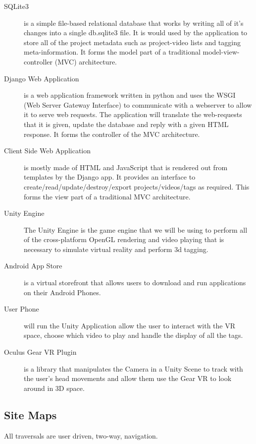 \documentclass[12pt]{report}
\begin{document}
\begin{description}
    \item [SQLite3] is a simple file-based relational database that works by
        writing all of it's changes into a single db.sqlite3 file. It is would
        used by the application to store all of the project metadata such as
        project-video lists and tagging meta-information. It forms the model
        part of a traditional model-view-controller (MVC) architecture.

    \item [Django Web Application] is a web application framework written in
        python and uses the WSGI (Web Server Gateway Interface) to communicate
        with a webserver to allow it to serve web requests. The application
        will translate the web-requests that it is given, update the database
        and reply with a given HTML response. It forms the controller of the
        MVC architecture.

    \item [Client Side Web Application] is mostly made of HTML and JavaScript
        that is rendered out from templates by the Django app. It provides an
        interface to create/read/update/destroy/export projects/videos/tags as
        required. This forms the view part of a traditional MVC architecture.

    \item [Unity Engine] The Unity Engine is the game engine that we will be
        using to perform all of the cross-platform OpenGL rendering and video
        playing that is necessary to simulate virtual reality and perform 3d
        tagging.

    \item [Android App Store] is a virtual storefront that allows users to
        download and run applications on their Android Phones. 

    \item [User Phone] will run the Unity Application allow the
        user to interact with the VR space, choose which video to play and
        handle the display of all the tags.

    \item [Oculus Gear VR Plugin] is a library that manipulates the Camera in a
        Unity Scene to track with the user's head movements and allow them use
        the Gear VR to look around in 3D space.
\end{description}

\subsection{Site Maps}
All traversals are user driven, two-way, navigation.
\end{document}
